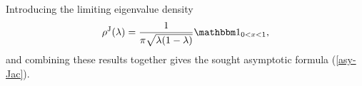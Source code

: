 \documentclass[11pt,a4paper]{article}
\numberwithin{equation}{section} %
\theoremstyle{plain}
\newtheorem{prop}{Proposition}
\theoremstyle{definition}
\numberwithin{prop}{section}
\numberwithin{cor}{section}
\numberwithin{remark}{section}
\begin{document}
Introducing the limiting eigenvalue density \cite[Prop.~3.6.3]{Fo10}
\begin{align}\label{arc-sin-law}
         \rho^{\rm J}(\lambda)=\frac{1}{\pi\sqrt{\lambda(1-\lambda)}} \mathbbm 1_{0<x<1},
     \end{align}
and
combining these results together gives the sought asymptotic formula (\ref{asy-Jac}).
\end{document}
